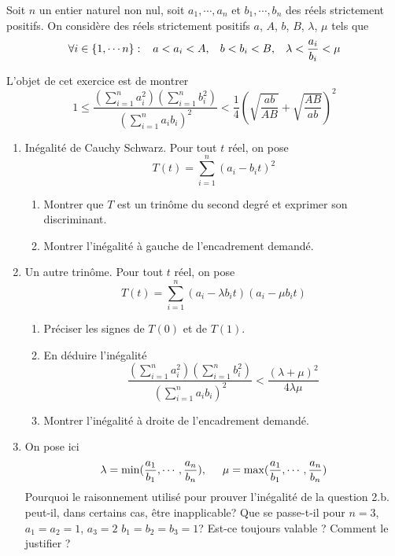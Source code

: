 Soit $n$ un entier naturel non nul, soit $a_1,\cdots,a_n$ et $b_1,\cdots,b_n$ des réels strictement positifs. On considère des réels strictement positifs $a$, $A$, $b$, $B$, $\lambda$, $\mu$ tels que
\begin{displaymath}
\forall i \in\{1,\cdots n\}:\hspace{0.3cm}  a < a_i < A,\hspace{0.3cm} b < b_i < B,\hspace{0.3cm} \lambda < \frac{a_i}{b_i} < \mu 
\end{displaymath}

L'objet de cet exercice est de montrer
\begin{displaymath}
  1\leq \frac{\left( \sum_{i=1}^n a_i^2\right) \left( \sum_{i=1}^n b_i^2\right) }{\left( \sum_{i=1}^n a_i b_i\right)^2 }
  < \frac{1}{4}\left(\sqrt{\frac{ab}{AB}} + \sqrt{\frac{AB}{ab}}\right)^2 
\end{displaymath}

\begin{enumerate}
  \item Inégalité de Cauchy Schwarz. Pour tout $t$ réel, on pose
\begin{displaymath}
  T(t) = \sum_{i=1}^{n}(a_i -  b_i t)^2
\end{displaymath}
\begin{enumerate}
  \item Montrer que $T$ est un trinôme du second degré et exprimer son discriminant.
  \item Montrer l'inégalité à gauche de l'encadrement demandé.
\end{enumerate}

\item Un autre trinôme. Pour tout $t$ réel, on pose
\begin{displaymath}
  T(t) = \sum_{i=1}^{n}(a_i-\lambda b_i t)(a_i-\mu b_i t)
\end{displaymath}
\begin{enumerate}
  \item Préciser les signes de $T(0)$ et de $T(1)$.
  \item En déduire l'inégalité
\begin{displaymath}
  \frac{\left( \sum_{i=1}^n a_i^2\right) \left( \sum_{i=1}^n b_i^2\right) }{\left( \sum_{i=1}^n a_i b_i\right)^2 }
  < \frac{(\lambda + \mu)^2}{4\lambda \mu} 
\end{displaymath}
  \item Montrer l'inégalité à droite de l'encadrement demandé.  
\end{enumerate}

\item On pose ici 
\begin{displaymath}
\lambda = \min(\frac{a_1}{b_1},\cdots,\frac{a_n}{b_n}),\hspace{0.5cm} \mu = \max(\frac{a_1}{b_1},\cdots,\frac{a_n}{b_n})  
\end{displaymath}
Pourquoi le raisonnement utilisé pour prouver l'inégalité de la question 2.b. peut-il, dans certains cas, être inapplicable? Que se passe-t-il pour $n=3$,  $a_1=a_2=1$, $a_3=2$ $b_1=b_2=b_3=1$? Est-ce toujours valable ? Comment le justifier ?

\end{enumerate}
